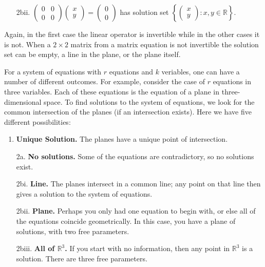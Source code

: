 \begin{enumerate}
\item[2bii.]
$\begin{pmatrix}
0	&0 	\\
0 	&0 	
\end{pmatrix} 
\begin{pmatrix}
 x \\ 
y 
\end{pmatrix} 
=
\begin{pmatrix}
0 \\ 
0
\end{pmatrix} $
has solution set 
$\left \{ 
\left(\begin{array}{c}
x \\ 
y
\end{array} \right)
: x, y\in \mathbb{R} \right\}.$
\end{enumerate}
Again, in the first case the linear operator is invertible while in the other cases it is not. When a $2\times 2$ matrix from a matrix equation is not invertible the solution set can be empty, a line in the plane, or the plane itself.


For a system of equations with $r$ equations and $k$ veriables, one can have a number of different outcomes.  For example, consider the case of $r$ equations in three variables.  Each of these equations is the equation of a plane in three-dimensional space.  To find solutions to the system of equations, we look for the common intersection of the planes (if an intersection exists).  Here we have \hypertarget{FIVE}{five different possibilities}:

\begin{enumerate}
\item \textbf{Unique Solution.}  The planes have a unique point of intersection.

\item[2a.] \textbf{No solutions.}  Some of the equations are contradictory, so no solutions exist.

\item[2bi.] \textbf{Line.}  The planes intersect in a common line; any point on that line then gives a solution to the system of equations.

\item[2bii.] \textbf{Plane.}  Perhaps you only had one equation to begin with, or else all of the equations coincide geometrically.  In this case, you have a plane of solutions, with two free parameters.


\item[2biii.] \textbf{All of $\mathbb{R}^3$.}  If you start with no information, then any point in $\mathbb{R}^3$ is a solution.  There are three free parameters.
\end{enumerate}

